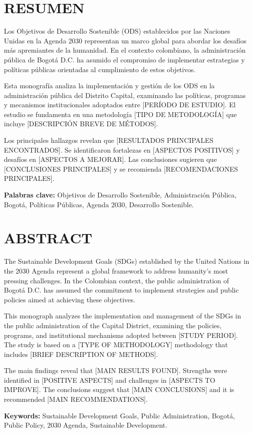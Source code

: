 \section*{RESUMEN}

Los Objetivos de Desarrollo Sostenible (ODS) establecidos por las Naciones Unidas en la Agenda 2030 representan un marco global para abordar los desafíos más apremiantes de la humanidad. En el contexto colombiano, la administración pública de Bogotá D.C. ha asumido el compromiso de implementar estrategias y políticas públicas orientadas al cumplimiento de estos objetivos. 

Esta monografía analiza la implementación y gestión de los ODS en la administración pública del Distrito Capital, examinando las políticas, programas y mecanismos institucionales adoptados entre [PERÍODO DE ESTUDIO]. El estudio se fundamenta en una metodología [TIPO DE METODOLOGÍA] que incluye [DESCRIPCIÓN BREVE DE MÉTODOS].

Los principales hallazgos revelan que [RESULTADOS PRINCIPALES ENCONTRADOS]. Se identificaron fortalezas en [ASPECTOS POSITIVOS] y desafíos en [ASPECTOS A MEJORAR]. Las conclusiones sugieren que [CONCLUSIONES PRINCIPALES] y se recomienda [RECOMENDACIONES PRINCIPALES].

\textbf{Palabras clave:} Objetivos de Desarrollo Sostenible, Administración Pública, Bogotá, Políticas Públicas, Agenda 2030, Desarrollo Sostenible.

\section*{ABSTRACT}

The Sustainable Development Goals (SDGs) established by the United Nations in the 2030 Agenda represent a global framework to address humanity's most pressing challenges. In the Colombian context, the public administration of Bogotá D.C. has assumed the commitment to implement strategies and public policies aimed at achieving these objectives.

This monograph analyzes the implementation and management of the SDGs in the public administration of the Capital District, examining the policies, programs, and institutional mechanisms adopted between [STUDY PERIOD]. The study is based on a [TYPE OF METHODOLOGY] methodology that includes [BRIEF DESCRIPTION OF METHODS].

The main findings reveal that [MAIN RESULTS FOUND]. Strengths were identified in [POSITIVE ASPECTS] and challenges in [ASPECTS TO IMPROVE]. The conclusions suggest that [MAIN CONCLUSIONS] and it is recommended [MAIN RECOMMENDATIONS].

\textbf{Keywords:} Sustainable Development Goals, Public Administration, Bogotá, Public Policy, 2030 Agenda, Sustainable Development.
